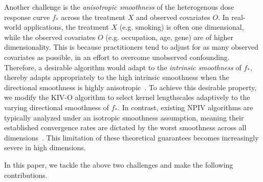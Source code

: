 \documentclass[11pt]{article}
\newcommand{\0}{\mathbf{0}}
\newcommand{\steve}[1]{#1}
\begin{document}
Another challenge is the \emph{anisotropic smoothness} of the heterogenous dose response curve $f_\ast$ across the treatment $X$ and observed covariates $O$.
In real-world applications, the treatment $X$ (e.g. smoking) is often one dimensional, while the observed covariates $O$ (e.g. occupation, age, gene) are of higher dimensionality. This is because practitioners tend to adjust for as many observed covariates as possible, in an effort to overcome unobserved confounding. 
Therefore, a desirable algorithm would adapt to the \emph{intrinsic smoothness} of $f_\ast$, thereby \steve{adapts appropriately to the high intrinsic smoothness when} the directional smoothness is highly anisotropic~\citep{hoffman2002random}.  
To achieve this desirable property, we modify the KIV-O algorithm to select kernel lengthscales adaptively to the varying directional smoothness of $f_\ast$. In contrast, existing NPIV algorithms are typically analyzed under an isotropic smoothness assumption, meaning their established convergence rates are dictated by the worst smoothness across all dimensions~\citep{singh2019kernel,singh2024kernel}. This limitation of these theoretical guarantees becomes increasingly severe in high dimensions. 




In this paper, we tackle the above two challenges and make the following contributions. 
\end{document}
